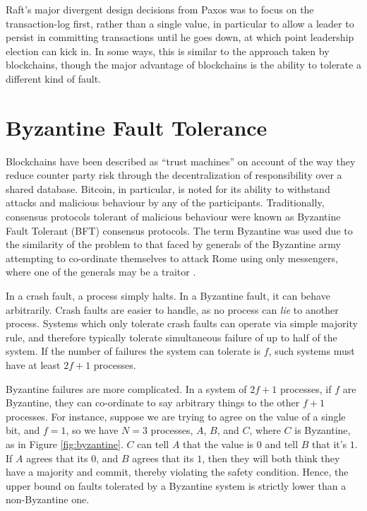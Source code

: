 Raft's major divergent design decisions from Paxos was to 
focus on the transaction-log first, rather than a single value,
in particular to allow a leader to persist in committing transactions until he goes down, 
at which point leadership election can kick in. 
In some ways, this is similar to the approach taken by blockchains, 
though the major advantage of blockchains is the ability to tolerate a different kind of fault.

\section{Byzantine Fault Tolerance}

Blockchains have been described as ``trust machines'' \cite{economist_blockchains} on account of the way they reduce counter party risk through the decentralization of responsibility over a shared database.
Bitcoin, in particular, is noted for its ability to withstand attacks and malicious behaviour by any of the participants. 
Traditionally, consensus protocols tolerant of malicious behaviour were known as Byzantine Fault Tolerant (BFT) consensus protocols.
The term Byzantine was used due to the similarity of the problem to that faced by generals of the Byzantine army attempting to co-ordinate themselves to attack Rome using only messengers,
where one of the generals may be a traitor \cite{lamport1982byzantine}.

In a crash fault, a process simply halts. In a Byzantine fault, it can behave arbitrarily.
Crash faults are easier to handle, as no process can \emph{lie} to another process.
Systems which only tolerate crash faults can operate via simple majority rule, 
and therefore typically tolerate simultaneous failure of up to half of the system.
If the number of failures the system can tolerate is $f$, such systems must have at least $2f+1$ processes.

Byzantine failures are more complicated. In a system of $2f+1$ processes, if $f$ are Byzantine, 
they can co-ordinate to say arbitrary things to the other $f+1$ processes.
For instance, suppose we are trying to agree on the value of a single bit, 
and $f=1$, so we have $N=3$ processes, $A$, $B$, and $C$, where $C$ is Byzantine, as in Figure \ref{fig:byzantine}.
$C$ can tell $A$ that the value is $0$ and tell $B$ that it's $1$. 
If $A$ agrees that its $0$, and $B$ agrees that its $1$, then they will both think they have a majority and commit, 
thereby violating the safety condition.
Hence, the upper bound on faults tolerated by a Byzantine system is strictly lower than a non-Byzantine one.

